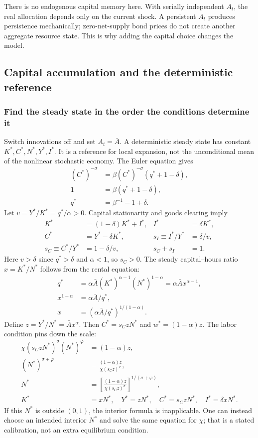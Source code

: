 There is no endogenous capital memory here. With serially independent $A_t$,
the real allocation depends only on the current shock. A persistent $A_t$
produces persistence mechanically; zero-net-supply bond prices do not create
another aggregate resource state. This is why adding the capital choice
changes the model.

\subsection{Capital accumulation and the deterministic reference}\label{sec:rbc-steady}

\subsubsection{Find the steady state in the order the conditions determine it}

Switch innovations off and set $A_t=\bar A$. A deterministic steady state has
constant $K^*,C^*,N^*,Y^*,I^*$. It is a reference for local expansion, not the
unconditional mean of the nonlinear stochastic economy. The Euler equation gives
\begin{align}
(C^*)^{-\sigma}&=\beta(C^*)^{-\sigma}(q^*+1-\delta),\\
1&=\beta(q^*+1-\delta),\\
q^*&=\beta^{-1}-1+\delta.
\end{align}
Let $v=Y^*/K^*=q^*/\alpha>0$. Capital stationarity and goods clearing imply
\begin{align}
K^*&=(1-\delta)K^*+I^*,&I^*&=\delta K^*,\\
C^*&=Y^*-\delta K^*,&s_I\equiv I^*/Y^*&=\delta/v,\\
s_C\equiv C^*/Y^*&=1-\delta/v,&s_C+s_I&=1.
\end{align}
Here $v>\delta$ since $q^*>\delta$ and $\alpha<1$, so $s_C>0$.
The steady capital--hours ratio $x=K^*/N^*$ follows from the rental equation:
\begin{align}
q^*&=\alpha\bar A(K^*)^{\alpha-1}(N^*)^{1-\alpha}
 =\alpha\bar A x^{\alpha-1},\\
x^{1-\alpha}&=\alpha\bar A/q^*,\\
x&=(\alpha\bar A/q^*)^{1/(1-\alpha)}.
\end{align}
Define $z=Y^*/N^*=\bar A x^\alpha$. Then $C^*=s_CzN^*$ and
$w^*=(1-\alpha)z$. The labor condition pins down the scale:
\begin{align}
\chi(s_CzN^*)^\sigma(N^*)^\varphi&=(1-\alpha)z,\\
(N^*)^{\sigma+\varphi}
 &=\frac{(1-\alpha)z}{\chi(s_Cz)^\sigma},\\
N^*&=\left[\frac{(1-\alpha)z}{\chi(s_Cz)^\sigma}\right]^{1/(\sigma+\varphi)},\\
K^*&=xN^*,\quad Y^*=zN^*,\quad C^*=s_CzN^*,\quad I^*=\delta xN^*.
\end{align}
If this $N^*$ is outside $(0,1)$, the interior formula is inapplicable. One can
instead choose an intended interior $N^*$ and solve the same equation for
$\chi$; that is a stated calibration, not an extra equilibrium condition.


